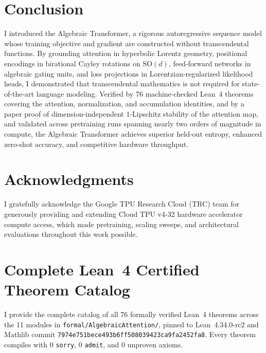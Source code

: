 \documentclass[11pt,a4paper]{article}
\theoremstyle{definition}
\newcommand{\SO}{\mathrm{SO}}
\begin{document}
\section{Conclusion}
\label{sec:conclusion}

I introduced the Algebraic Transformer, a rigorous autoregressive sequence model whose training objective and gradient are constructed without transcendental functions. By grounding attention in hyperbolic Lorentz geometry, positional encodings in birational Cayley rotations on $\SO(d)$, feed-forward networks in algebraic gating units, and loss projections in Lorentzian-regularized likelihood heads, I demonstrated that transcendental mathematics is not required for state-of-the-art language modeling. Verified by 76 machine-checked Lean~4 theorems covering the attention, normalization, and accumulation identities, and by a paper proof of dimension-independent $1$-Lipschitz stability of the attention map, and validated across pretraining runs spanning nearly two orders of magnitude in compute, the Algebraic Transformer achieves superior held-out entropy, enhanced zero-shot accuracy, and competitive hardware throughput.

\section*{Acknowledgments}
I gratefully acknowledge the Google TPU Research Cloud (TRC) team for generously providing and extending Cloud TPU v4-32 hardware accelerator compute access, which made pretraining, scaling sweeps, and architectural evaluations throughout this work possible.




\clearpage
\appendix

\section{Complete Lean~4 Certified Theorem Catalog}
\label{app:lean_catalog}

I provide the complete catalog of all 76 formally verified Lean~4 theorems across the 11 modules in \texttt{formal/AlgebraicAttention/}, pinned to Lean~4.34.0-rc2 and Mathlib commit \texttt{7974e751bece493b6ff508039423ca9fa2452fa8}. Every theorem compiles with 0 \texttt{sorry}, 0 \texttt{admit}, and 0 unproven axioms.
\end{document}
